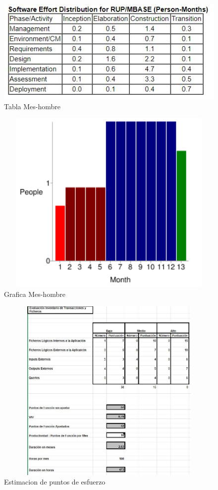 \begin{figure}[H]
	\centering
	\includegraphics[scale=1.7]{imgs/2.JPG}
	\caption{Tabla Mes-hombre}
\end{figure}

\begin{figure}[H]
	\centering
	\includegraphics[width=16cm, height=9cm]{imgs/Grafica.png}
	\caption{Grafica Mes-hombre}
\end{figure}

\begin{figure}[H]
	\centering
	\includegraphics[width=16cm, height=9cm]{imgs/Estimacion de PF.JPG}
	\caption{Estimacion de puntos de esfuerzo}
\end{figure}


